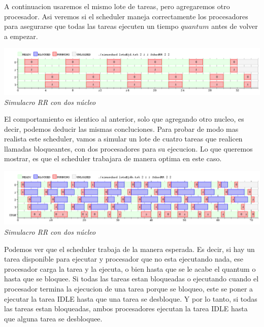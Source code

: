 A continuacion usaremos el mismo lote de tareas, pero agregaremos otro procesador. Asi veremos si el scheduler maneja correctamente 
los procesadores para asegurarse que todas las tareas ejecuten un tiempo $quantum$ antes de volver a empezar.

\vspace{\baselineskip}
\begin{center}
\includegraphics[scale=0.45]{../tp1/Test/resEj4Co2SB.png}
\\
\vspace{1pt}
\footnotesize\textit{Simulacro RR con dos n\'ucleo}
\end{center}
\vspace{\baselineskip}

El comportamiento es identico al anterior, solo que agregando otro nucleo, es decir, podemos deducir las mismas concluciones. Para probar de 
modo mas realista este scheduler, vamos a simular un lote de cuatro tareas que realicen llamadas bloqueantes, con dos procesadores para su ejecucion.
Lo que queremos mostrar, es que el scheduler trabajara de manera optima en este caso.

\vspace{\baselineskip}
\begin{center}
\includegraphics[scale=0.45]{../tp1/Test/resEj4Co2CB.png}
\\
\vspace{1pt}
\footnotesize\textit{Simulacro RR con dos n\'ucleo}
\end{center}
\vspace{\baselineskip}

Podemos ver que el scheduler trabaja de la manera esperada. Es decir, si hay un tarea disponible para ejecutar y procesador que no esta ejecutando nada,
ese procesador carga la tarea y la ejecuta, o bien hasta que se le acabe el quantum o hasta que se bloquee. Si todas las tareas estan bloqueadas 
o ejecutando cuando el procesador termina la ejecucion de una tarea porque se bloqueo, este se poner a ejecutar la tarea IDLE hasta que 
una tarea se desbloque. Y por lo tanto, si todas las tareas estan bloqueadas, ambos procesadores ejecutan la tarea IDLE hasta que alguna 
tarea se desbloquee.



